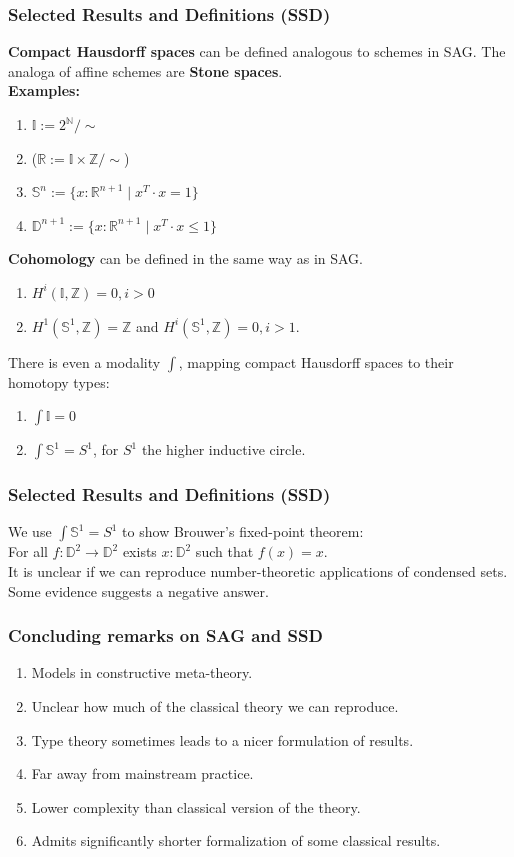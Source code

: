 \documentclass{beamer}
\begin{document}
\begin{frame}
  \frametitle{Selected Results and Definitions (SSD)}
  \textbf{Compact Hausdorff spaces} can be defined analogous to schemes in SAG.
  \pause
  The analoga of affine schemes are \textbf{Stone spaces}. \\
  \pause
  \textbf{Examples:}
  \begin{enumerate}[(1)]
  \item $\mathbb I := 2^{\mathbb N}/\sim $
  \item ($\mathbb R := \mathbb I \times \mathbb Z/\sim$)
  \item $\mathbb S^n := \{x : \mathbb R^{n+1}\mid x^T\cdot x=1\} $
  \item $\mathbb D^{n+1} := \{x : \mathbb R^{n+1}\mid x^T\cdot x\leq 1\} $
  \end{enumerate}
  \pause
  \textbf{Cohomology} can be defined in the same way as in SAG. \\
  \pause
  \begin{enumerate}[(1)]
  \item $H^i(\mathbb I, \mathbb Z)=0, i>0$
  \item $H^1(\mathbb S^1,\mathbb Z)=\mathbb Z$ and $H^i(\mathbb S^1,\mathbb Z)=0, i>1$.
  \end{enumerate}
  \pause
  There is even a modality $\int$, mapping compact Hausdorff spaces to their homotopy types:
  \begin{enumerate}[(1)]
  \item $\int \mathbb I = 0$
  \item $\int \mathbb S^1 = S^1$, for $S^1$ the higher inductive circle.
  \end{enumerate}
\end{frame}

\begin{frame}
  \frametitle{Selected Results and Definitions (SSD)}
  We use $\int \mathbb S^1=S^1$ to show Brouwer's fixed-point theorem: \\
  For all $f:\mathbb D^2\to \mathbb D^2$ exists $x:\mathbb D^2$ such that $f(x)=x$. \\
  \pause
  \vspace{2cm}
  It is unclear if we can reproduce number-theoretic applications of condensed sets.
  Some evidence suggests a negative answer.
  \vspace{2cm}
\end{frame}

\begin{frame}
  \frametitle{Concluding remarks on SAG and SSD}
  \begin{enumerate}[(1)]
  \item Models in constructive meta-theory.
  \item Unclear how much of the classical theory we can reproduce.
  \item Type theory sometimes leads to a nicer formulation of results.
  \item Far away from mainstream practice.
  \item Lower complexity than classical version of the theory.
  \item Admits significantly shorter formalization of some classical results. 
  \end{enumerate}
\end{frame}
\end{document}

